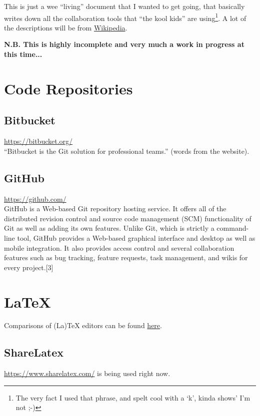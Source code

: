 \documentclass{article}
\date{today}
\begin{document}
\pagestyle{fancy}

\noindent
This is just a wee ``living'' document that I wanted to get going, that basically writes down all the collaboration tools that ``the kool kids'' are using\footnote{The very fact I used that phrase, and spelt cool with a `k', kinda shows' I'm not ;-)}.  
A lot of the descriptions will be from 
\href{https://en.wikipedia.org/wiki/Main_Page}{Wikipedia}.

\noindent
{\bf N.B. This is highly incomplete and very much a work in progress at this time...}



\section{Code Repositories}

\subsection{Bitbucket}
\href{https://bitbucket.org/}{https://bitbucket.org/}\\
``Bitbucket is the Git solution for professional teams.'' 
(words from the website). 

\subsection{GitHub}
\href{https://github.com/}{https://github.com/} \\
GitHub is a Web-based Git repository hosting service. It offers all of the distributed revision control and source code management (SCM) functionality of Git as well as adding its own features. Unlike Git, which is strictly a command-line tool, GitHub provides a Web-based graphical interface and desktop as well as mobile integration. It also provides access control and several collaboration features such as bug tracking, feature requests, task management, and wikis for every project.[3]

\section{LaTeX}
Comparisons of (La)TeX editors can be found 
\href{https://en.wikipedia.org/wiki/Comparison_of_TeX_editors}{here}. 

\subsection{ShareLatex}
\href{https://www.sharelatex.com/}{https://www.sharelatex.com/} is being used right now. 
\end{document}
